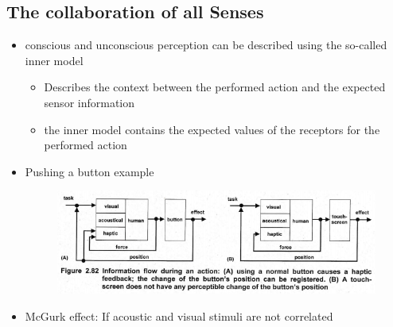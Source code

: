 \documentclass{standalone}
\begin{document}
\subsection{The collaboration of all Senses}
\begin{itemize}
	\item conscious and unconscious perception can be described using the so-called inner model
	\begin{itemize}
		\item Describes the context between the performed action and the expected sensor information
		\item the inner model contains the expected values of the receptors for the performed action
	\end{itemize}
	\item Pushing a button example
	\begin{figure}[H]
			\centering
			\includegraphics[width = 0.5\linewidth]{Figures/2_82.png}
	\end{figure}
	\item McGurk effect: If acoustic and visual stimuli are not correlated
\end{itemize}
\end{document}
